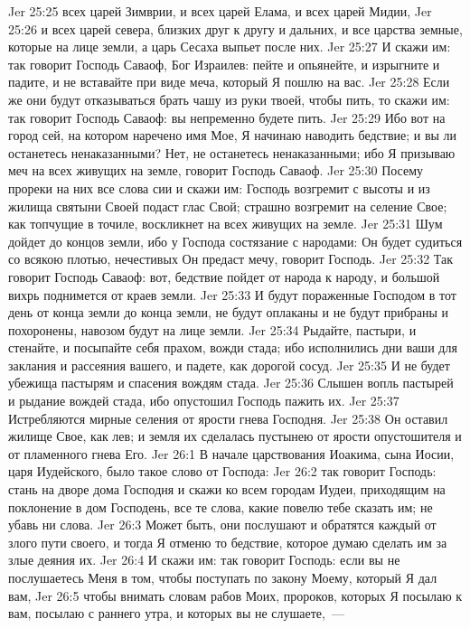 \vs Jer 25:25 всех царей Зимврии, и всех царей Елама, и всех царей Мидии,
\vs Jer 25:26 и всех царей севера, близких друг к другу и дальних, и все царства земные, которые на лице земли, а царь Сесаха выпьет после них.
\vs Jer 25:27 И скажи им: так говорит Господь Саваоф, Бог Израилев: пейте и опьянейте, и изрыгните и падите, и не вставайте при виде меча, который Я пошлю на вас.
\vs Jer 25:28 Если же они будут отказываться брать чашу из руки твоей, чтобы пить, то скажи им: так говорит Господь Саваоф: вы непременно будете пить.
\vs Jer 25:29 Ибо вот на город сей, на котором наречено имя Мое, Я начинаю наводить бедствие; и вы ли останетесь ненаказанными? Нет, не останетесь ненаказанными; ибо Я призываю меч на всех живущих на земле, говорит Господь Саваоф.
\vs Jer 25:30 Посему прореки на них все слова сии и скажи им: Господь возгремит с высоты и из жилища святыни Своей подаст глас Свой; страшно возгремит на селение Свое; как топчущие в точиле, воскликнет на всех живущих на земле.
\vs Jer 25:31 Шум дойдет до концов земли, ибо у Господа состязание с народами: Он будет судиться со всякою плотью, нечестивых Он предаст мечу, говорит Господь.
\rsbpar\vs Jer 25:32 Так говорит Господь Саваоф: вот, бедствие пойдет от народа к народу, и большой вихрь поднимется от краев земли.
\vs Jer 25:33 И будут пораженные Господом в тот день от конца земли до конца земли, не будут оплаканы и не будут прибраны и похоронены, навозом будут на лице земли.
\vs Jer 25:34 Рыдайте, пастыри, и стенайте, и посыпайте себя прахом, вожди стада; ибо исполнились дни ваши для заклания и рассеяния вашего, и падете, как дорогой сосуд.
\vs Jer 25:35 И не будет убежища пастырям и спасения вождям стада.
\vs Jer 25:36 Слышен вопль пастырей и рыдание вождей стада, ибо опустошил Господь пажить их.
\vs Jer 25:37 Истребляются мирные селения от ярости гнева Господня.
\vs Jer 25:38 Он оставил жилище Свое, как лев; и земля их сделалась пустынею от ярости опустошителя и от пламенного гнева Его.
\vs Jer 26:1 В начале царствования Иоакима, сына Иосии, царя Иудейского, было такое слово от Господа:
\vs Jer 26:2 так говорит Господь: стань на дворе дома Господня и скажи ко всем городам Иудеи, приходящим на поклонение в дом Господень, все те слова, какие повелю тебе сказать им; не убавь ни слова.
\vs Jer 26:3 Может быть, они послушают и обратятся каждый от злого пути своего, и тогда Я отменю то бедствие, которое думаю сделать им за злые деяния их.
\vs Jer 26:4 И скажи им: так говорит Господь: если вы не послушаетесь Меня в том, чтобы поступать по закону Моему, который Я дал вам,
\vs Jer 26:5 чтобы внимать словам рабов Моих, пророков, которых Я посылаю к вам, посылаю с раннего утра, и которых вы не слушаете,~---
